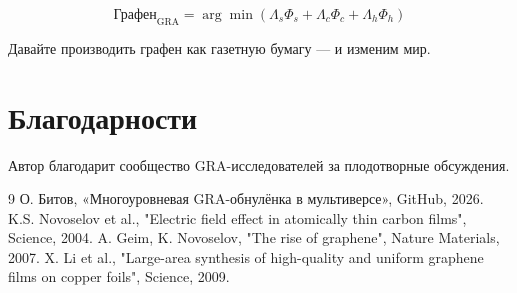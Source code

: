 \documentclass[12pt,a4paper]{article}
\begin{document}
\[
\boxed{\text{Графен}_{\text{GRA}} = \arg\min \left( \Lambda_s \Phi_s + \Lambda_c \Phi_c + \Lambda_h \Phi_h \right)}
\]

Давайте производить графен как газетную бумагу — и изменим мир.

\section*{Благодарности}

Автор благодарит сообщество GRA-исследователей за плодотворные обсуждения.

\begin{thebibliography}{9}
 О. Битов, «Многоуровневая GRA-обнулёнка в мультиверсе», GitHub, 2026.
 K.S. Novoselov et al., "Electric field effect in atomically thin carbon films", Science, 2004.
 A. Geim, K. Novoselov, "The rise of graphene", Nature Materials, 2007.
 X. Li et al., "Large-area synthesis of high-quality and uniform graphene films on copper foils", Science, 2009.
\end{thebibliography}
\end{document}
